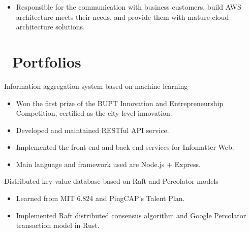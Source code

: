 \documentclass{resume}
\newcommand{\en}[1]{#1}
\newcommand{\zh}[1]{}
\begin{document}
\en{}
\zh{\datedsubsection{\textbf{\href{https://www.amazonaws.cn/}{亚马逊 AWS 中国（AWS China Inc.）}}}{2020/05 -- 2020/06}}
\en{}
\zh{\role{解决方案架构}{解决方案架构师实习}}
\begin{itemize}
      \item \en{Responsible for the communication with business customers, build AWS architecture meets their needs, and provide them with mature cloud architecture solutions.}
            \zh{负责 ToB 客户的技术接洽沟通，搭建符合其需求的 AWS 产品架构，为客户提供成熟的云架构解决方案}
\end{itemize}

\section{\faGithubAlt\ \en{Portfolios}\zh{个人项目}}
\en{Information aggregation system based on machine learning}
\zh{基于机器学习的信息聚合系统}
\begin{itemize}
      \item \en{Won the first prize of the BUPT Innovation and Entrepreneurship Competition, certified as the city-level innovation.}
            \zh{项目荣获北京邮电大学创新创业大赛一等奖，通过北京市级高等院校大创项目认定}
      \item \en{Developed and maintained RESTful API service.}
            \zh{开发维护相关 RESTful API 服务}
      \item \en{Implemented the front-end and back-end services for Infomatter Web.}
            \zh{实现了 Infomatter Web 版的前后端服务}
      \item \en{Main language and framework used are Node.js + Express.}
            \zh{语言和框架为 Node.js + Express}
\end{itemize}

\en{Distributed key-value database based on Raft and Percolator models}
\zh{基于 Raft 与 Percolator 模型的分布式键值数据库}
\begin{itemize}
      \item \en{Learned from MIT 6.824 and PingCAP's Talent Plan.}
            \zh{学习 MIT 6.824 和 PingCAP Talent Plan 后完成}
      \item \en{Implemented Raft distributed consensus algorithm and Google Percolator transaction model in Rust.}
            \zh{使用 Rust 开发，基于 Raft 分布式共识算法和 Google Percolator 事务模型实现}
\end{itemize}
\end{document}
